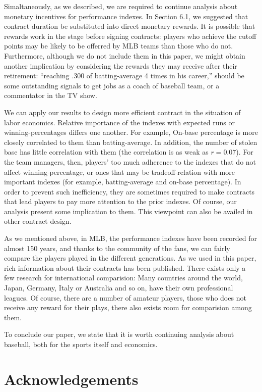 \documentclass[dvipdfmx, 12pt]{article}
\begin{document}
Simaltaneously, as we described, we are required to continue analysis about monetary incentives for performance indexes. In Section 6.1, we suggested that contract duration be substituted into direct monetary rewards. It is possible that rewards work in the stage before signing contracts: players who achieve the cutoff points may be likely to be offerred by MLB teams than those who do not. Furthermore, although we do not include them in this paper, we might obtain another implication by considering the rewards they may receive after their retirement: ``reaching .300 of batting-average 4 times in his career,'' should be some outstanding signals to get jobs as a coach of baseball team, or a commentator in the TV show.

We can apply our results to design more efficient contract in the situation of labor economics. Relative importance of the indexes with expected runs or winning-percentages differs one another. For example, On-base percentage is more closely correlated to them than batting-average. In addition, the number of stolen base has little correlation with them (the correlation is as weak as $r=0.07$). For the team managers, then, players' too much adherence to the indexes that do not affect winning-percentage, or ones that may be tradeoff-relation with more important indexes (for example, batting-average and on-base percentage). In order to prevent such inefficiency, they are sometimes required to make contracts that lead players to pay more attention to the prior indexes. Of course, our analysis present some implication to them. This viewpoint can also be availed in other contract design.

As we mentioned above, in MLB, the performance indexes have been recorded for almost 150 years, and thanks to the community of the fans, we can fairly compare the players played in the different generations. As we used in this paper, rich information about their contracts has been published. There exists only a few research for international comparision: Many countries around the world, Japan, Germany, Italy or Australia and so on, have their own professional leagues. Of course, there are a number of amateur players, those who does not receive any reward for their plays, there also exists room for comparision among them.

To conclude our paper, we state that it is worth continuing analysis about baseball, both for the sports itself and economics.

\section*{Acknowledgements}
\end{document}
